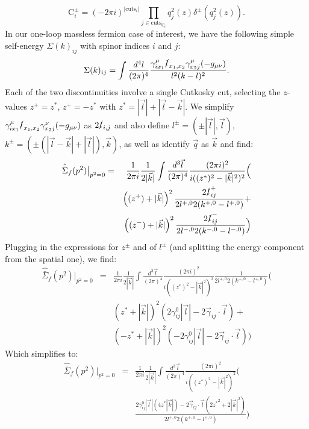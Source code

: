 \documentclass[11pt]{article}
\begin{document}
\begin{equation}
\textrm{C}_i^{\pm} = (-2\pi i)^{|\textrm{cuts}_i|} \prod_{j\in \textrm{cuts}_{\textrm{C}_i}} q_j^2(z) \delta^\pm\left(q_j^2(z)\right).
\end{equation}
In our one-loop massless fermion case of interest, we have the following simple self-energy $\Sigma(k)_{ij}$ with spinor indices $i$ and $j$:
\begin{equation}
\Sigma(k)_{ij} = \int \frac{d^4 l}{(2\pi)^4} \frac{
\gamma_{i{x_1}}^\mu  \slashed{l}_{x_1,x_2} \gamma_{{x_2}j}^\mu (-g_{\mu\nu})
}{l^2(k-l)^2}.
\end{equation}
Each of the two discontinuities involve a single Cutkosky cut, selecting the $z$-values $z^+=z^*$, $z^+=-z^*$ with $z^*=|\vec{l}|+|\vec{l}-\vec{k}|$.
We simplify $\gamma_{i{x_1}}^\mu  \slashed{l}_{x_1,x_2} \gamma_{{x_2}j}^\nu (-g_{\mu\nu})$ as $2 \slashed{l}_{i,j}$ and also define $l^\pm=(\pm |\vec{l}|,\vec{l})$, $k^\pm=(\pm(|\vec{l}-\vec{k}|+|\vec{l}|),\vec{k})$, as well as identify $\vec{q}$ as $\vec{k}$ and find:
\begin{eqnarray}
\hat{\bar{\Sigma}}_{f}(p^2){\big |}_{p^2=0} &=& \frac{ 1 }{2\pi i} \frac{1}{2 |\vec{k}| } \int \frac{d^3 \vec{l}}{(2\pi)^4} \frac{(2\pi i)^2}{i( (z^*)^2 - |\vec{k}|^2)^2 }\Big ( \nonumber \\
&&\left( (z^+) + |\vec{k}| \right)^2 \frac{ 2 \slashed{l}^+_{ij} }{2l^{+,0}2(k^{+,0}-l^{+,0})} + \nonumber \\
&&\left( (z^-) + |\vec{k}| \right)^2 \frac{ 2 \slashed{l}^-_{ij} }{2l^{-,0}2(k^{-,0}-l^{-,0})}
\Big )
\end{eqnarray}
Plugging in the expressions for $z^\pm$ and of $l^\pm$ (and splitting the energy component from the spatial one), we find:
\begin{eqnarray}
\hat{\bar{\Sigma}}_{f}(p^2){\big |}_{p^2=0} &=& \frac{ 1 }{2\pi i} \frac{1}{2 |\vec{k}| } \int \frac{d^3 \vec{l}}{(2\pi)^4} \frac{(2\pi i)^2}{i( (z^*)^2 - |\vec{k}|^2)^2 }
\frac{1}{2l^{+,0}2(k^{+,0}-l^{+,0})}
\Big ( \nonumber \\
&&\left( z^* + |\vec{k}| \right)^2 \left( 2 \gamma^0_{ij} |\vec{l}| - 2 \vec{\gamma}_{ij}\cdot \vec{l} \right) + \nonumber \\
&&\left( -z^* + |\vec{k}| \right)^2 \left( -2 \gamma^0_{ij} |\vec{l}| - 2 \vec{\gamma}_{ij}\cdot \vec{l} \right)
\Big )
\end{eqnarray}
Which simplifies to:
\begin{eqnarray}
\hat{\bar{\Sigma}}_{f}(p^2){\big |}_{p^2=0} &=& \frac{ 1 }{2\pi i} \frac{1}{2 |\vec{k}| } \int \frac{d^3 \vec{l}}{(2\pi)^4} \frac{(2\pi i)^2}{i( (z^*)^2 - |\vec{k}|^2)^2 }
\Big ( \\
&&\frac{
2 \gamma^0_{ij} |\vec{l}| \left( 4 z^* |\vec{k}| \right) - 2 \vec{\gamma}_{ij}\cdot \vec{l} \left( 2{z^*}^2 + 2 |\vec{k}|^2 \right)
}{2l^{+,0}2(k^{+,0}-l^{+,0})}
\Big )
\end{eqnarray}





\end{document}
